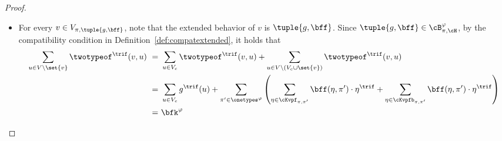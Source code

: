 \begin{proof}
\begin{itemize}
        \item
        For every $v \in V_{\pi, \tuple{g, \bff}}$,
        note that the extended behavior of $v$ is $\tuple{g, \bff}$.
        Since $\tuple{g, \bff} \in \cB^\varphi_{\pi, \cH}$,
        by the compatibility condition in Definition~\ref{def:compatextended}, it holds that
        \begin{equation*}
            \begin{aligned}
                \sum_{u \in V \setminus \set{v}} \twotypeof^\trif(v, u)
                \ =\ &
                \sum_{u \in V_c} \twotypeof^\trif(v, u) +
                \sum_{u \in V \setminus (V_c \cup \set{v})} \twotypeof^\trif(v, u) \\
                \ =\ &
                \sum_{u \in V_c} g^\trif(u) + 
                \sum_{\pi' \in \onetypes^\varphi}
                \left(
                    \sum_{\eta \in \cKvpf_{\pi, \pi'}} \bff(\eta, \pi') \cdot \eta^\trif +
                    \sum_{\eta \in \cKvpfb_{\pi, \pi'}} \bff(\eta, \pi') \cdot \eta^\trif
                \right) \\
                \ =\ &\bfk^\varphi
            \end{aligned}
        \end{equation*}
    \end{itemize}
\end{proof}
